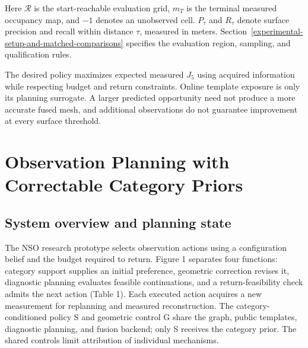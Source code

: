 Here \(\mathcal R\) is the start-reachable evaluation grid, \(m_T\) is the terminal measured occupancy map, and \(-1\) denotes an unobserved cell. \(P_\tau\) and \(R_\tau\) denote surface precision and recall within distance \(\tau\), measured in meters. Section~\ref{experimental-setup-and-matched-comparisons} specifies the evaluation region, sampling, and qualification rules.

The desired policy maximizes expected measured \(J_5\) using acquired information while respecting budget and return constraints. Online template exposure is only its planning surrogate. A larger predicted opportunity need not produce a more accurate fused mesh, and additional observations do not guarantee improvement at every surface threshold.

\hypertarget{observation-planning-with-correctable-category-priors}{%
\section{Observation Planning with Correctable Category Priors}\label{observation-planning-with-correctable-category-priors}}

\hypertarget{system-overview-and-planning-state}{%
\subsection{System overview and planning state}\label{system-overview-and-planning-state}}

The NSO research prototype selects observation actions using a configuration belief and the budget required to return. Figure 1 separates four functions: category support supplies an initial preference, geometric correction revises it, diagnostic planning evaluates feasible continuations, and a return-feasibility check admits the next action (Table 1). Each executed action acquires a new measurement for replanning and measured reconstruction. The category-conditioned policy S and geometric control G share the graph, public templates, diagnostic planning, and fusion backend; only S receives the category prior. The shared controls limit attribution of individual mechanisms.

